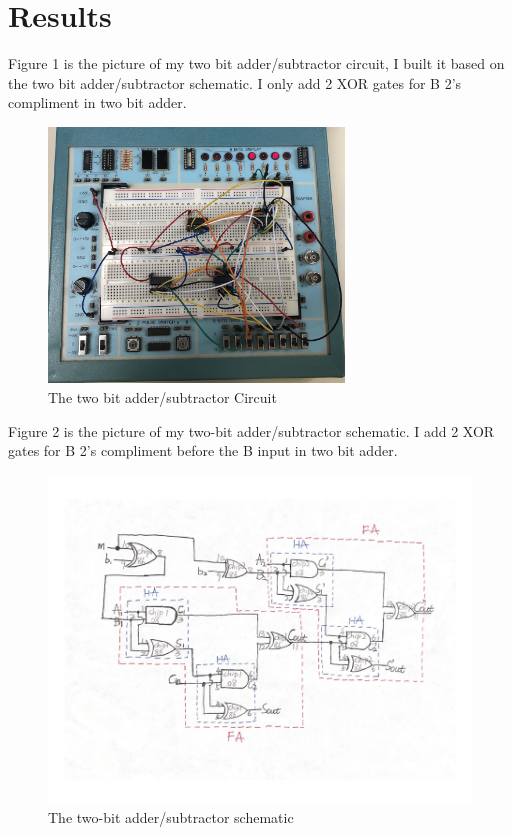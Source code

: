 \documentclass[11pt]{article}
\begin{document}
\section*{Results}

	Figure 1 is the picture of my two bit adder/subtractor circuit, I built it based on the two bit adder/subtractor schematic. I only add 2 XOR gates for B 2's compliment in two bit adder.\\
	\begin{figure}[ht]\centering
		\includegraphics[width=0.7\textwidth,trim=5cm 5cm 5cm 5cm,clip]{2-bitSubtractor}
		\caption{The  two bit adder/subtractor Circuit}
		\label{fig:2-bitSubtractor}
	\end{figure}
	
	Figure 2 is the picture of my two-bit adder/subtractor schematic. I add 2 XOR gates for B 2's compliment before the B input in two bit adder.\\
	\begin{figure}[ht]\centering
		\includegraphics[width=1.0\textwidth]{Schematic}
		\caption{The two-bit adder/subtractor schematic}
		\label{fig:Schematic}
	\end{figure}
	
\end{document}
